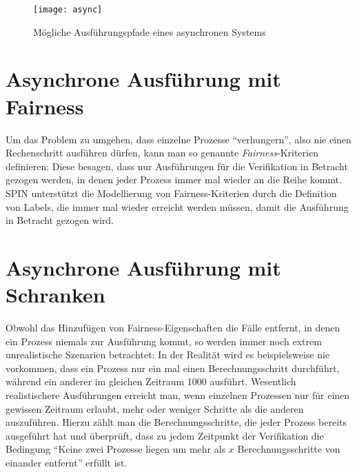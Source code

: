 \begin{figure}[h]
  \centering
  \texttt{[image: async]}
  \caption{Mögliche Ausführungspfade eines asynchronen Systems}
  \label{fig:asynchronous_paths}
\end{figure}
\section{Asynchrone Ausführung mit Fairness}
Um das Problem zu umgehen, dass einzelne Prozesse "`verhungern"', also nie einen Rechenschritt ausführen dürfen, kann man so genannte \emph{Fairness}-Kriterien definieren:
Diese besagen, dass nur Ausführungen für die Verifikation in Betracht gezogen werden, in denen jeder Prozess immer mal wieder an die Reihe kommt.
SPIN unterstützt die Modellierung von Fairness-Kriterien durch die Definition von Labels, die immer mal wieder erreicht werden müssen, damit die Ausführung in Betracht gezogen wird.
\section{Asynchrone Ausführung mit Schranken}
Obwohl das Hinzufügen von Fairness-Eigenschaften die Fälle entfernt, in denen ein Prozess niemals zur Ausführung kommt, so werden immer noch extrem unrealistische Szenarien betrachtet:
In der Realität wird es beispielsweise nie vorkommen, dass ein Prozess nur ein mal einen Berechnungsschritt durchführt, während ein anderer im gleichen Zeitraum 1000 ausführt.
Wesentlich realistischere Ausführungen erreicht man, wenn einzelnen Prozessen nur für einen gewissen Zeitraum erlaubt, mehr oder weniger Schritte als die anderen auszuführen.
Hierzu zählt man die Berechnungsschritte, die jeder Prozess bereits ausgeführt hat und überprüft, dass zu jedem Zeitpunkt der Verifikation die Bedingung "`Keine zwei Prozesse liegen um mehr als $x$ Berechnungsschritte von einander entfernt"' erfüllt ist.

